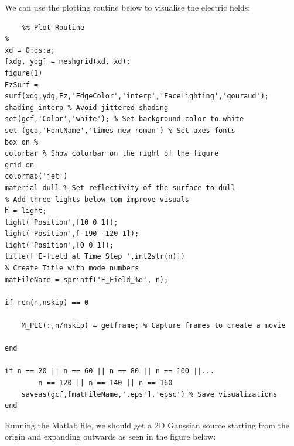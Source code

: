 \documentclass[11pt]{article}
\begin{document}
\normalsize
We can use the plotting routine below to visualise the electric fields:
\begin{mdframed}[backgroundcolor=gray!20]
  \scriptsize
  \begin{verbatim}
    %% Plot Routine
%
xd = 0:ds:a;
[xdg, ydg] = meshgrid(xd, xd);
figure(1)
EzSurf = surf(xdg,ydg,Ez,'EdgeColor','interp','FaceLighting','gouraud');
shading interp % Avoid jittered shading
set(gcf,'Color','white'); % Set background color to white
set (gca,'FontName','times new roman') % Set axes fonts
box on %
colorbar % Show colorbar on the right of the figure
grid on
colormap('jet')
material dull % Set reflectivity of the surface to dull
% Add three lights below tom improve visuals
h = light;
light('Position',[10 0 1]);
light('Position',[-190 -120 1]);
light('Position',[0 0 1]);
title(['E-field at Time Step ',int2str(n)])
% Create Title with mode numbers
matFileName = sprintf('E_Field_%d', n);

if rem(n,nskip) == 0
    
    M_PEC(:,n/nskip) = getframe; % Capture frames to create a movie
    
end

if n == 20 || n == 60 || n == 80 || n == 100 ||...
        n == 120 || n == 140 || n == 160
    saveas(gcf,[matFileName,'.eps'],'epsc') % Save visualizations
end
  \end{verbatim}
\end{mdframed}

Running the Matlab file, we should get a 2D Gaussian source starting from the origin and expanding outwards as seen in the figure below:
\end{document}
